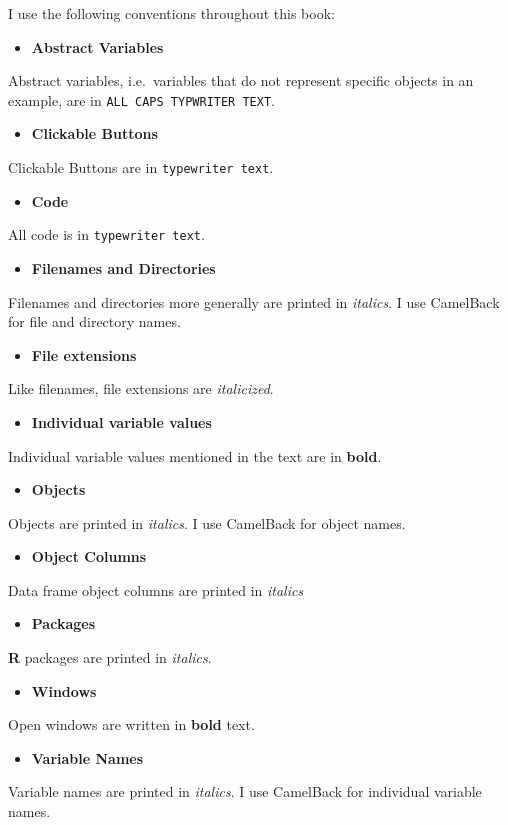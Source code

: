 I use the following conventions throughout this book:

\begin{itemize}
\item
  \textbf{Abstract Variables}
\end{itemize}
Abstract variables, i.e.~variables that do not represent specific
objects in an example, are in \texttt{ALL CAPS TYPWRITER TEXT}.

\begin{itemize}
\item
  \textbf{Clickable Buttons}
\end{itemize}
Clickable Buttons are in \texttt{typewriter text}.

\begin{itemize}
\item
  \textbf{Code}
\end{itemize}
All code is in \texttt{typewriter text}.

\begin{itemize}
\item
  \textbf{Filenames and Directories}
\end{itemize}
Filenames and directories more generally are printed in \emph{italics}.
I use CamelBack for file and directory names.

\begin{itemize}
\item
  \textbf{File extensions}
\end{itemize}
Like filenames, file extensions are \emph{italicized}.

\begin{itemize}
\item
  \textbf{Individual variable values}
\end{itemize}
Individual variable values mentioned in the text are in \textbf{bold}.

\begin{itemize}
\item
  \textbf{Objects}
\end{itemize}
Objects are printed in \emph{italics}. I use CamelBack for object names.

\begin{itemize}
\item
  \textbf{Object Columns}
\end{itemize}
Data frame object columns are printed in \emph{italics}

\begin{itemize}
\item
  \textbf{Packages}
\end{itemize}
\textbf{R} packages are printed in \emph{italics}.

\begin{itemize}
\item
  \textbf{Windows}
\end{itemize}
Open windows are written in \textbf{bold} text.

\begin{itemize}
\item
  \textbf{Variable Names}
\end{itemize}
Variable names are printed in \emph{italics}. I use CamelBack for
individual variable names.
